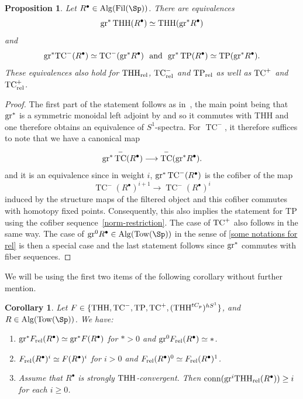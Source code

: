 \documentclass[english,10pt]{amsart}
\newcommand{\rel}{\textup{rel}}
\newtheorem{coro}{Corollary}[section]
\newtheorem{prop}{Proposition}[section]
\theoremstyle{definition}
\numberwithin{equation}{section}
\DeclareMathOperator{\TC}{TC}
\newcommand{\ntc}{\mathrm{TC}^{-}}
\DeclareMathOperator{\tp}{\ensuremath{\textup{TP}}}
\DeclareMathOperator{\tc}{\ensuremath{\textup{TC}}}
\DeclareMathOperator{\thh}{\ensuremath{\textup{THH}}}
\newcommand{\rntc}{\mathrm{TC}_{\rel}^{-}}
\newcommand{\rtp}{\mathrm{TP}_{\rel}}
\newcommand{\rtc}{\mathrm{TC}_{\rel}}
\newcommand{\rthh}{\mathrm{THH}_{\rel}}
\newcommand{\Fil}{\mathrm{Fil}}
\newcommand{\Tow}{\mathrm{Tow}}
\newcommand{\Alg}{\mathrm{Alg}}
\newcommand{\TP}{\mathrm{TP}}
\newcommand{\gr}{\textup{gr}^*}
\newcommand{\grzero}{\textup{gr}^0}
\begin{document}
\begin{prop}\label{E1page}
Let $R^{\bullet}\in \Alg(\Fil(\Sp))$. 
There are equivalences 
\begin{equation}\label{eq assoc graded of thh} \gr\thh(R^{\bullet})\simeq \thh(\gr R^{\bullet})
\end{equation}
and 
\begin{equation}\label{eq assoc graded of ntc and tp}
\gr \ntc (R^{\bullet} )\simeq \ntc(\gr R^{\bullet}) \textup{\ \ and \ } 
\gr \tp (R^{\bullet} ) \simeq \tp(\gr R^{\bullet}).
\end{equation}
These equivalences also hold for $\rthh$, $\rntc$ and $\rtp$ as well as $\tc^{+}$ and $\rtc^{+}$.
\end{prop}
\begin{proof}
The first part of the statement follows as in~\cite[Theorem~3.3.10]{AKS18}, the main point being that $\gr$ is a symmetric monoidal left adjoint by \cite[Proposition~3.2.1]{lurie2015rotation} and \cite[Lemma~3.30]{GP18} so it commutes with THH and one therefore obtains an equivalence of $S^1$-spectra. For $\TC^{-}$, it therefore suffices to note that we have a canonical map 
\[ 
\gr\TC^{-}(R^{\bullet})\longrightarrow \TC^{-}(\gr R^{\bullet}).
\]
and it is an equivalence since in weight $i$, $\gr\TC^{-}(R^{\bullet})$ is the cofiber of the map 
\[\TC^{-}(R^{\bullet})^{i+1}\to \TC^{-}(R^{\bullet})^{i}\] 
induced by the structure maps of the filtered object  and this cofiber commutes with homotopy fixed points. Consequently, this also implies the statement for $\TP$ using the cofiber sequence~\eqref{norm-restriction}. The case of $\tc^+$ also follows in the same way. The case of $\mathrm{gr}^0R^{\bullet}\in \Alg(\Tow(\Sp))$ in the sense of \autoref{some notations for rel} is then a special case and the last statement follows since $\gr$ commutes with fiber sequences. 
\end{proof}

 
We will be using the first two items of the following corollary without further mention. 
\begin{coro}\label{coro frel associated graded and strong convergence}
Let $F\in \{\thh,\ntc,\tp,\tc^{+}, (\thh^{tC_p})^{hS^1}\}$, and $R \in \Alg(\Tow(\Sp))$. We have:
\begin{enumerate}
\item \label{item 1 coro frel associated graded and strong convergence}$\gr F_{\rel}(R^\bullet) \simeq \gr F(R^\bullet)$ for $*>0$ and $\grzero F_{\rel}(R^\bullet) \simeq *$.
\item \label{item 2 coro frel associated graded and strong convergence}$F_{\rel}(R^\bullet)^i \simeq F(R^\bullet)^i$ for $i>0$ and $F_{\rel}(R^\bullet)^0 \simeq F_{\rel}(R^\bullet)^1$.
\item \label{item 3 coro frel associated graded and strong convergence}Assume that $R^\bullet$ is strongly $\thh$-convergent. Then $\mathrm{conn}(\textup{gr}^i\rthh(R^\bullet)) \geq i$ for each $i \geq 0$.
\end{enumerate}
\end{coro}
\end{document}

